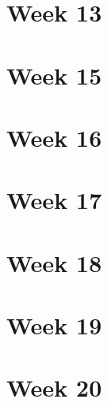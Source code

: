 

\section{Week 13}



\section{Week 15}



\section{Week 16}



\section{Week 17}



\section{Week 18}



\section{Week 19}



\section{Week 20}


